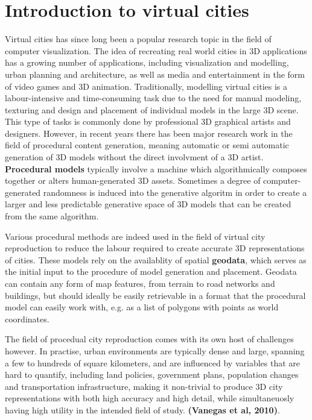 \documentclass{kththesis}
\begin{document}
\section{Introduction to virtual cities}

Virtual cities has since long been a popular research topic in the field of computer visualization.
The idea of recreating real world cities in 3D applications has a growing number of applications, including visualization and modelling, urban planning and architecture, as well as media and entertainment in the form of video games and 3D animation.
Traditionally, modelling virtual cities is a labour-intensive and time-consuming task due to the need for manual modeling, texturing and design and placement of individual models in the large 3D scene.
This type of tasks is commonly done by professional 3D graphical artists and designers.
However, in recent years there has been major research work in the field of procedural content generation, meaning automatic or semi automatic generation of 3D models without the direct involvment of a 3D artist.
\textbf{Procedural models} typically involve a machine which algorithmically composes together or alters human-generated 3D assets.
Sometimes a degree of computer-generated randomness is induced into the generative algoritm in order to create a larger and less predictable generative space of 3D models that can be created from the same algorithm.

Various procedural methods are indeed used in the field of virtual city reproduction to reduce the labour required to create accurate 3D representations of cities.
These models rely on the availablity of spatial \textbf{geodata}, which serves as the initial input to the procedure of model generation and placement.
Geodata can contain any form of map features, from terrain to road networks and buildings, but should ideally be easily retrievable in a format that the procedural model can easily work with, e.g. as a list of polygons with points as world coordinates.

The field of procedual city reproduction comes with its own host of challenges however.
In practise, urban environments are typically dense and large, spanning a few to hundreds of square kilometers, and are influenced by variables that are hard to quantify, including land policies, government plans, population changes and transportation infrastructure, making it non-trivial to produce 3D city representations with both high accuracy and high detail, while simultaneuosly having high utility in the intended field of study.
\textbf{(Vanegas et al, 2010)}.
\end{document}
